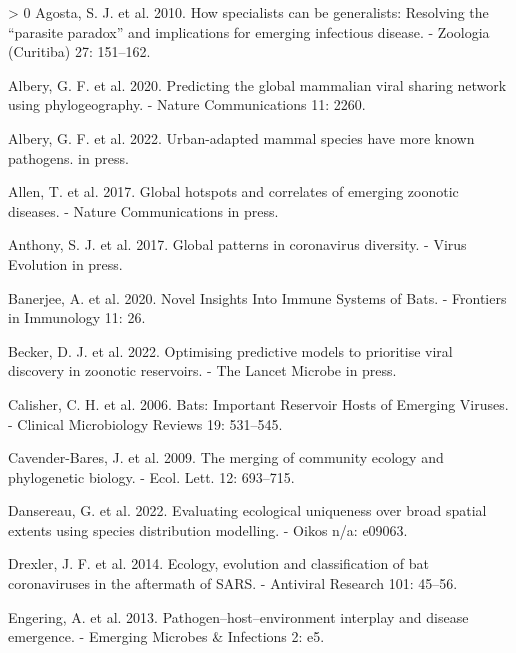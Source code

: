 \documentclass[10pt,oneside]{article}
\newlength{\cslhangindent}
\newenvironment{CSLReferences}[3] %
 {%
  \setlength{\parindent}{0pt}
  \ifodd #1 \everypar{\setlength{\hangindent}{\cslhangindent}}\ignorespaces\fi
  \ifnum #2 > 0
  \setlength{\parskip}{#2\baselineskip}
  \fi
 }%
 {}
\begin{document}
\hypertarget{refs}{}
\begin{CSLReferences}{1}{0}
\leavevmode\hypertarget{ref-Agosta2010HowSpe}{}%
Agosta, S. J. et al. 2010. How specialists can be generalists: Resolving
the {``parasite paradox''} and implications for emerging infectious
disease. - Zoologia (Curitiba) 27: 151--162.

\leavevmode\hypertarget{ref-Albery2020PreGlo}{}%
Albery, G. F. et al. 2020. Predicting the global mammalian viral sharing
network using phylogeography. - Nature Communications 11: 2260.

\leavevmode\hypertarget{ref-Albery2022UrbMam}{}%
Albery, G. F. et al. 2022. Urban-adapted mammal species have more known
pathogens. in press.

\leavevmode\hypertarget{ref-Allen2017GloHot}{}%
Allen, T. et al. 2017. Global hotspots and correlates of emerging
zoonotic diseases. - Nature Communications in press.

\leavevmode\hypertarget{ref-Anthony2017GloPat}{}%
Anthony, S. J. et al. 2017. Global patterns in coronavirus diversity. -
Virus Evolution in press.

\leavevmode\hypertarget{ref-Banerjee2020NovIns}{}%
Banerjee, A. et al. 2020. Novel Insights Into Immune Systems of Bats. -
Frontiers in Immunology 11: 26.

\leavevmode\hypertarget{ref-Becker2022OptPre}{}%
Becker, D. J. et al. 2022. Optimising predictive models to prioritise
viral discovery in zoonotic reservoirs. - The Lancet Microbe in press.

\leavevmode\hypertarget{ref-Calisher2006BatImp}{}%
Calisher, C. H. et al. 2006. Bats: Important Reservoir Hosts of Emerging
Viruses. - Clinical Microbiology Reviews 19: 531--545.

\leavevmode\hypertarget{ref-Cavender-Bares2009MerCom}{}%
Cavender-Bares, J. et al. 2009. The merging of community ecology and
phylogenetic biology. - Ecol. Lett. 12: 693--715.

\leavevmode\hypertarget{ref-Dansereau2022EvaEco}{}%
Dansereau, G. et al. 2022. Evaluating ecological uniqueness over broad
spatial extents using species distribution modelling. - Oikos n/a:
e09063.

\leavevmode\hypertarget{ref-Drexler2014EcoEvo}{}%
Drexler, J. F. et al. 2014. Ecology, evolution and classification of bat
coronaviruses in the aftermath of SARS. - Antiviral Research 101:
45--56.

\leavevmode\hypertarget{ref-Engering2013PatHos}{}%
Engering, A. et al. 2013. Pathogen--host--environment interplay and
disease emergence. - Emerging Microbes \& Infections 2: e5.


\end{CSLReferences}
\end{document}
